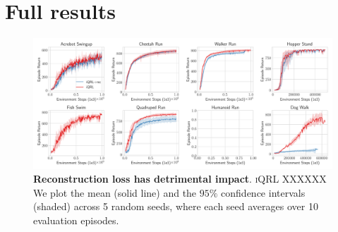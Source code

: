 \documentclass{article}
\theoremstyle{plain}
\theoremstyle{definition}
\theoremstyle{remark}
\newcommand{\our}{\textsc{iQRL}\xspace}
\begin{document}
\section{Full results}


\begin{figure}[ht]
\vskip 0.2in
\begin{center}
\centerline{\includegraphics[width=1.0\textwidth]{./figs/reconstruction-loss-ablation.pdf}}
\caption{\textbf{Reconstruction loss has detrimental impact}. \our XXXXXX We plot the mean (solid line) and the $95\%$ confidence intervals (shaded) across 5 random seeds, where each seed averages over 10 evaluation episodes.}
\label{fig:multi-task-pretraining}
\end{center}
\vskip -0.2in
\end{figure}



\end{document}
